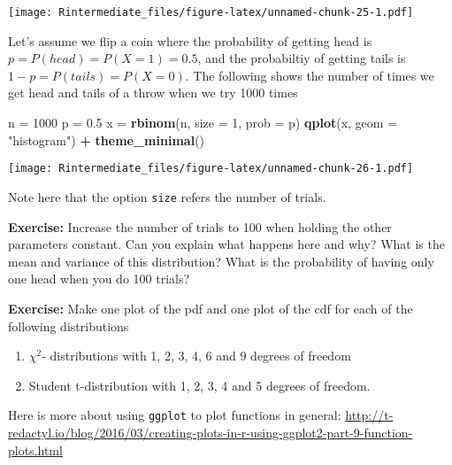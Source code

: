 \documentclass[]{article}
\newenvironment{Shaded}{\begin{snugshade}}{\end{snugshade}}
\newcommand{\KeywordTok}[1]{\textcolor[rgb]{0.13,0.29,0.53}{\textbf{#1}}}
\newcommand{\DataTypeTok}[1]{\textcolor[rgb]{0.13,0.29,0.53}{#1}}
\newcommand{\DecValTok}[1]{\textcolor[rgb]{0.00,0.00,0.81}{#1}}
\newcommand{\FloatTok}[1]{\textcolor[rgb]{0.00,0.00,0.81}{#1}}
\newcommand{\StringTok}[1]{\textcolor[rgb]{0.31,0.60,0.02}{#1}}
\newcommand{\OperatorTok}[1]{\textcolor[rgb]{0.81,0.36,0.00}{\textbf{#1}}}
\newcommand{\NormalTok}[1]{#1}
\providecommand{\tightlist}{%
  \setlength{\itemsep}{0pt}\setlength{\parskip}{0pt}}
\begin{document}
\texttt{[image: Rintermediate\_files/figure-latex/unnamed-chunk-25-1.pdf]}

Let's assume we flip a coin where the probability of getting head is
\(p = P(head) = P(X=1) = 0.5\), and the probabiltiy of getting tails is
\(1-p = P(tails) = P(X=0)\). The following shows the number of times we
get head and tails of a throw when we try 1000 times

\begin{Shaded}
\begin{Highlighting}[]
\NormalTok{n =}\StringTok{ }\DecValTok{1000}
\NormalTok{p =}\StringTok{ }\FloatTok{0.5}
\NormalTok{x =}\StringTok{ }\KeywordTok{rbinom}\NormalTok{(n, }\DataTypeTok{size =} \DecValTok{1}\NormalTok{, }\DataTypeTok{prob =}\NormalTok{ p)}
\KeywordTok{qplot}\NormalTok{(x, }\DataTypeTok{geom =} \StringTok{"histogram"}\NormalTok{) }\OperatorTok{+}\StringTok{ }\KeywordTok{theme_minimal}\NormalTok{()}
\end{Highlighting}
\end{Shaded}

\texttt{[image: Rintermediate\_files/figure-latex/unnamed-chunk-26-1.pdf]}

Note here that the option \texttt{size} refers the number of trials.

\textbf{Exercise:} Increase the number of trials to 100 when holding the
other parameters constant. Can you explain what happens here and why?
What is the mean and variance of this distribution? What is the
probability of having only one head when you do 100 trials?

\begingroup\color{dg}

\endgroup

\textbf{Exercise:} Make one plot of the pdf and one plot of the cdf for
each of the following distributions

\begin{enumerate}
\def\labelenumi{\arabic{enumi}.}
\tightlist
\item
  \(\chi^2\)- distributions with 1, 2, 3, 4, 6 and 9 degrees of freedom
\item
  Student t-distribution with 1, 2, 3, 4 and 5 degrees of freedom.
\end{enumerate}

\begingroup\color{dg}

\endgroup

Here is more about using \texttt{ggplot} to plot functions in general:
\url{http://t-redactyl.io/blog/2016/03/creating-plots-in-r-using-ggplot2-part-9-function-plots.html}
\end{document}
